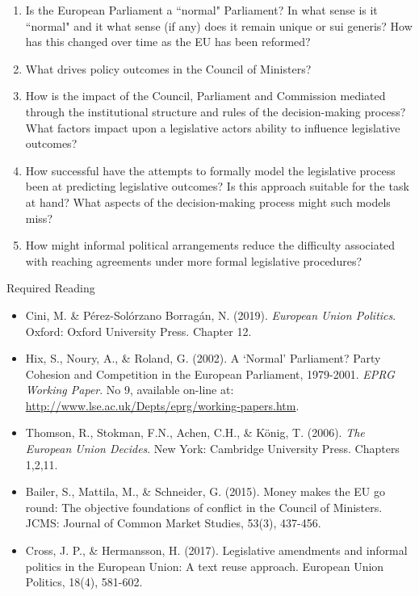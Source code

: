 \begin{enumerate}
	\item Is the European Parliament a ``normal" Parliament? In what sense is it ``normal" and it what sense (if any) does it remain unique or sui generis? How has this changed over time as the EU has been reformed?
	\item What drives policy outcomes in the Council of Ministers?
	\item How is the impact of the Council, Parliament and Commission mediated through the institutional structure and rules of the decision-making process? What factors impact upon a legislative actors ability to influence legislative outcomes? 
	\item How successful have the attempts to formally model the legislative process been at predicting legislative outcomes? Is this approach suitable for the task at hand? What aspects of the decision-making process might such models miss?
	\item How might informal political arrangements reduce the difficulty associated with reaching agreements under more formal legislative procedures?
\end{enumerate}

\noindent Required Reading

\begin{itemize}
	\item Cini, M. \& P\'{e}rez-Sol\'{o}rzano Borrag\'{a}n, N. (2019). \textit{European Union Politics}. Oxford: Oxford University Press. Chapter 12.
	\item Hix, S., Noury, A., \& Roland, G. (2002). A `Normal' Parliament? Party Cohesion and Competition in the European Parliament, 1979-2001. \textit{EPRG Working Paper}. No 9, available on-line at: \url{http://www.lse.ac.uk/Depts/eprg/working-papers.htm}.
	\item Thomson, R., Stokman, F.N., Achen, C.H., \& K\"{o}nig, T. (2006). \textit{The European Union Decides}. New York: Cambridge University Press. Chapters 1,2,11.
	\item Bailer, S., Mattila, M., \& Schneider, G. (2015). Money makes the EU go round: The objective foundations of conflict in the Council of Ministers. JCMS: Journal of Common Market Studies, 53(3), 437-456.
	\item Cross, J. P., \& Hermansson, H. (2017). Legislative amendments and informal politics in the European Union: A text reuse approach. European Union Politics, 18(4), 581-602.
\end{itemize}

